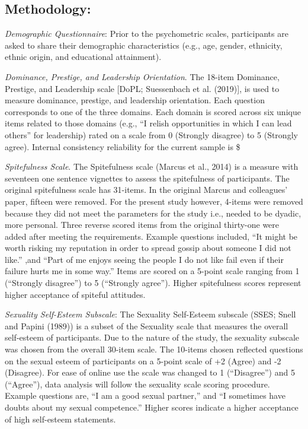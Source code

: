 \documentclass[
  english,
  a4paper]{apa7}
\begin{document}
\hypertarget{methodology}{%
\subsection{Methodology:}\label{methodology}}

\emph{Demographic Questionnaire}:
Prior to the psychometric scales, participants are asked to share their demographic characteristics (e.g., age, gender, ethnicity, ethnic origin, and educational attainment).

\emph{Dominance, Prestige, and Leadership Orientation}.
The 18-item Dominance, Prestige, and Leadership scale {[}DoPL; Suessenbach et al. (2019){]}, is used to measure dominance, prestige, and leadership orientation. Each question corresponds to one of the three domains. Each domain is scored across six unique items related to those domains (e.g., ``I relish opportunities in which I can lead others'' for leadership) rated on a scale from 0 (Strongly disagree) to 5 (Strongly agree). Internal consistency reliability for the current sample is \$

\emph{Spitefulness Scale}.
The Spitefulness scale (Marcus et al., 2014) is a measure with seventeen one sentence vignettes to assess the spitefulness of participants. The original spitefulness scale has 31-items. In the original Marcus and colleagues' paper, fifteen were removed. For the present study however, 4-items were removed because they did not meet the parameters for the study i.e., needed to be dyadic, more personal. Three reverse scored items from the original thirty-one were added after meeting the requirements. Example questions included, ``It might be worth risking my reputation in order to spread gossip about someone I did not like.'' ,and ``Part of me enjoys seeing the people I do not like fail even if their failure hurts me in some way.'' Items are scored on a 5-point scale ranging from 1 (``Strongly disagree'') to 5 (``Strongly agree''). Higher spitefulness scores represent higher acceptance of spiteful attitudes.

\emph{Sexuality Self-Esteem Subscale}:
The Sexuality Self-Esteem subscale (SSES; Snell and Papini (1989)) is a subset of the Sexuality scale that measures the overall self-esteem of participants. Due to the nature of the study, the sexuality subscale was chosen from the overall 30-item scale. The 10-items chosen reflected questions on the sexual esteem of participants on a 5-point scale of +2 (Agree) and -2 (Disagree). For ease of online use the scale was changed to 1 (``Disagree'') and 5 (``Agree''), data analysis will follow the sexuality scale scoring procedure. Example questions are, ``I am a good sexual partner,'' and ``I sometimes have doubts about my sexual competence.'' Higher scores indicate a higher acceptance of high self-esteem statements.
\end{document}
